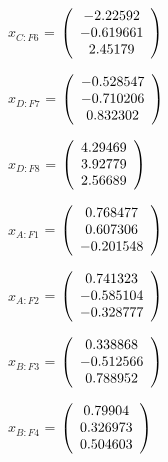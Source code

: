 \begin{description}
$x_{C:F6}$ = $\left( \begin{array} {ccc}   -2.22592 \\  -0.619661 \\    2.45179
\end{array} \right)\\ \\$

$x_{D:F7}$ = $\left( \begin{array} {ccc}  -0.528547 \\  -0.710206 \\   0.832302
\end{array} \right)\\ \\$

$x_{D:F8}$ = $\left( \begin{array} {ccc}    4.29469 \\    3.92779 \\    2.56689
\end{array} \right)\\ \\$

$\hat{x}_{A:F1}$ = $\left( \begin{array} {ccc}   0.768477 \\   0.607306 \\  -0.201548
\end{array} \right)\\ \\$

$\hat{x}_{A:F2}$ = $\left( \begin{array} {ccc}   0.741323 \\  -0.585104 \\  -0.328777
\end{array} \right)\\ \\$

$\hat{x}_{B:F3}$ = $\left( \begin{array} {ccc}   0.338868 \\  -0.512566 \\   0.788952
\end{array} \right)\\ \\$

$\hat{x}_{B:F4}$ = $\left( \begin{array} {ccc}    0.79904 \\   0.326973 \\   0.504603
\end{array} \right)\\ \\$


\end{description}
